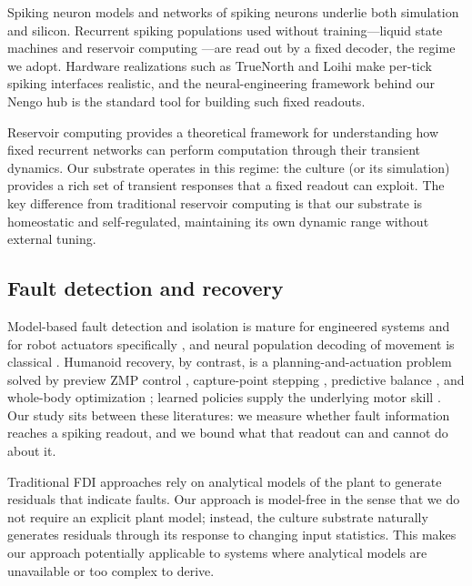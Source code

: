 Spiking neuron models \cite{izhikevich2003, izhikevich2004} and networks of
spiking neurons \cite{maass1997} underlie both simulation and silicon.
Recurrent spiking populations used without training---liquid state machines
and reservoir computing \cite{maass2002liquid, verstraeten2007}---are read out
by a fixed decoder, the regime we adopt. Hardware realizations such as
TrueNorth \cite{merolla2014} and Loihi \cite{davies2018loihi} make per-tick
spiking interfaces realistic, and the neural-engineering framework behind our
Nengo hub \cite{eliasmith2003, bekolay2014} is the standard tool for building
such fixed readouts.

Reservoir computing \cite{verstraeten2007} provides a theoretical framework
for understanding how fixed recurrent networks can perform computation through
their transient dynamics. Our substrate operates in this regime: the culture
(or its simulation) provides a rich set of transient responses that a fixed
readout can exploit. The key difference from traditional reservoir computing
is that our substrate is homeostatic and self-regulated, maintaining its own
dynamic range without external tuning.

\subsection{Fault detection and recovery}

Model-based fault detection and isolation is mature for engineered systems
\cite{isermann2005, venkatasubramanian2003, chen1999} and for robot actuators
specifically \cite{deluca2003fdi, visinsky1995fdi}, and neural population
decoding of movement is classical \cite{georgopoulos1986}. Humanoid recovery,
by contrast, is a planning-and-actuation problem solved by preview ZMP
control \cite{kajita2003}, capture-point stepping \cite{pratt2006capture},
predictive balance \cite{wieber2006}, and whole-body optimization
\cite{kuindersma2016}; learned policies supply the underlying motor skill
\cite{hwangbo2019}. Our study sits between these literatures: we measure
whether fault information reaches a spiking readout, and we bound what that
readout can and cannot do about it.

Traditional FDI approaches \cite{isermann2005} rely on analytical models of
the plant to generate residuals that indicate faults. Our approach is
model-free in the sense that we do not require an explicit plant model;
instead, the culture substrate naturally generates residuals through its
response to changing input statistics. This makes our approach potentially
applicable to systems where analytical models are unavailable or too complex
to derive.

